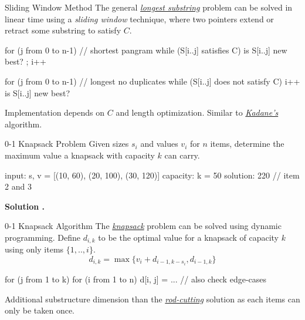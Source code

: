 \documentclass{cognito}
\begin{document}
\begin{note}{Sliding Window Method}
	The general \hyperref[note:Longest Substring Problem]{\it longest substring} problem can be solved in linear time using a
	\emph{sliding window} technique, where two pointers extend or retract some substring  to satisfy $C$.
	\begin{largecode}
 for (j from 0 to n-1)     // shortest pangram
 	while (S[i..j] satisfies C)
		is S[i..j] new best? ; i++
	\end{largecode}
	\vspace{-5pt}
	\begin{largecode}
 for (j from 0 to n-1)     // longest no duplicates
 	while (S[i..j] does not satisfy C) i++
	is S[i..j] new best?
	\end{largecode}
	\begin{remark} Implementation depends on $C$ and length optimization.
		Similar to \hyperref[note:Kadane's Algorithm]{\it Kadane's} algorithm.
	\end{remark}
	\vspace{-5pt}
\end{note}

\begin{note}{0-1 Knapsack Problem}
	Given sizes $s_i$ and values $v_i$ for $n$ items, determine the maximum value
	a knapsack with capacity $k$ can carry.
	\begin{largecode}
 input: s, v = [(10, 60), (20, 100), (30, 120)]
 capacity: k = 50
 solution: 220  // item 2 and 3 
	\end{largecode}
	\bf Solution \hyperref[note:0-1 Knapsack Algorithm]{\solutionref}.
\end{note}

\begin{note}{0-1 Knapsack Algorithm}
	The \hyperref[note:0-1 Knapsack Problem]{\it knapsack} problem can be solved using dynamic programming.
	Define $d_{i,k}$ to be the optimal value for a knapsack of capacity $k$ using only items $\{1,..,i\}$.
	$$
		d_{i, k} = \max \{v_i +  d_{i-1, k - s_i}, d_{i-1, k} \}
	$$
	\vspace{-15pt}
	\begin{largecode}
for (j from 1 to k)
	for (i from 1 to n)
		d[i, j] = ...  // also check edge-cases
	\end{largecode}
	\begin{remark} Additional substructure dimension than the \hyperref[note:Rod Cutting Solution]{\it rod-cutting} solution
		as each items can only be taken once.%
	\end{remark} \vspace{-5pt}
\end{note}
\end{document}
